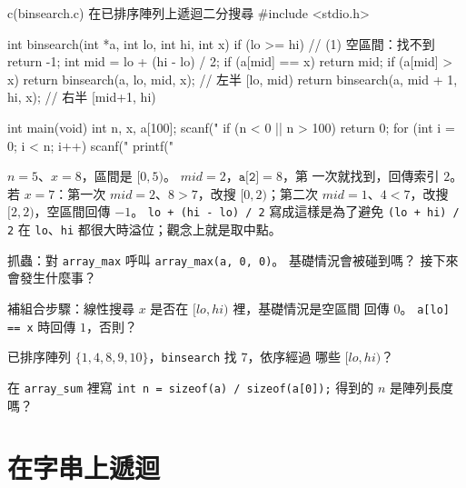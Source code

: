\begin{example}{c}{(binsearch.c) 在已排序陣列上遞迴二分搜尋}
#include <stdio.h>

int binsearch(int *a, int lo, int hi, int x) {
    if (lo >= hi) {                    // (1) 空區間：找不到
        return -1;
    }
    int mid = lo + (hi - lo) / 2;
    if (a[mid] == x) {
        return mid;
    }
    if (a[mid] > x) {
        return binsearch(a, lo, mid, x);      // 左半 [lo, mid)
    }
    return binsearch(a, mid + 1, hi, x);      // 右半 [mid+1, hi)
}

int main(void) {
    int n, x, a[100];
    scanf("%
    if (n < 0 || n > 100) {
        return 0;
    }
    for (int i = 0; i < n; i++) {
        scanf("%
    }
    printf("%
}
\end{example}


$n = 5$、$x = 8$，區間是 $[0, 5)$。 $mid = 2$，$\texttt{a[2]} = 8$，第
一次就找到，回傳索引 $2$。 若 $x = 7$：第一次 $mid = 2$、$8 > 7$，改搜
$[0, 2)$；第二次 $mid = 1$、$4 < 7$，改搜 $[2, 2)$，空區間回傳 $-1$。
\texttt{lo + (hi - lo) / 2} 寫成這樣是為了避免 \texttt{(lo + hi) / 2}
在 \texttt{lo}、\texttt{hi} 都很大時溢位；觀念上就是取中點。


\begin{drills}[label=drills:rec-array]
\item 抓蟲：對 \texttt{array\_max} 呼叫 \texttt{array\_max(a, 0, 0)}。
基礎情況會被碰到嗎？ 接下來會發生什麼事？
\item 補組合步驟：線性搜尋 $x$ 是否在 $[lo, hi)$ 裡，基礎情況是空區間
回傳 $0$。 \texttt{a[lo] == x} 時回傳 $1$，否則？
\item 已排序陣列 $\{1,4,8,9,10\}$，\texttt{binsearch} 找 $7$，依序經過
哪些 $[lo, hi)$？
\item 在 \texttt{array\_sum} 裡寫 \texttt{int n = sizeof(a) / sizeof(a[0]);}
得到的 $n$ 是陣列長度嗎？
\end{drills}

\section{在字串上遞迴}
\label{sec:rec-string}

